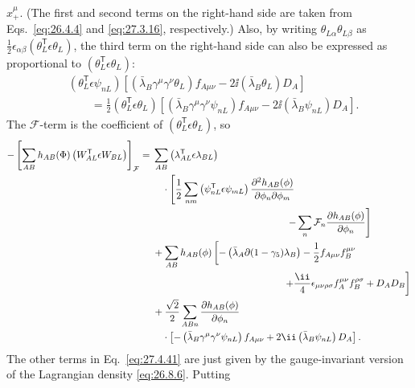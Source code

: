 \(x_+^\mu\). (The first and second terms on the right-hand side are taken
from Eqs.~\eqref{eq:26.4.4} and \eqref{eq:27.3.16}, respectively.) Also, by
writing \(\theta_{L\alpha}\theta_{L\beta}\) as
\(\tfrac12\epsilon_{\alpha\beta}
(\theta_L^{\mathsf T}\epsilon\theta_L)\), the third term on the right-hand
side can also be expressed as proportional to
\((\theta_L^{\mathsf T}\epsilon\theta_L)\):
\[
  \begin{aligned}
  &\left(\theta_L^{\mathsf T}\epsilon\psi_{nL}\right)
  \left[
    \left(\bar\lambda_B\gamma^\mu\gamma^\nu\theta_L\right)f_{A\mu\nu}
    -2\ii\left(\bar\lambda_B\theta_L\right)D_A
  \right]
  \\
  &\qquad
  =\frac12\left(\theta_L^{\mathsf T}\epsilon\theta_L\right)
  \left[
    \left(\bar\lambda_B\gamma^\mu\gamma^\nu\psi_{nL}\right)f_{A\mu\nu}
    -2\ii\left(\bar\lambda_B\psi_{nL}\right)D_A
  \right].
  \end{aligned}
\]
The \(\mathcal{F}\)-term is the coefficient of
\((\theta_L^{\mathsf T}\epsilon\theta_L)\), so
\[
  \begin{aligned}
  -\left[
    \sum_{AB}h_{AB}(\Phi)
    \left(W_{AL}^{\mathsf T}\epsilon W_{BL}\right)
  \right]_{\mathcal{F}}
  ={}&
  \sum_{AB}\left(\lambda_{AL}^{\mathsf T}\epsilon\lambda_{BL}\right)
  \\
  &\quad{}\cdot
  \left[
    \frac12\sum_{nm}
      \left(\psi_{nL}^{\mathsf T}\epsilon\psi_{mL}\right)
      \frac{\partial^2h_{AB}(\phi)}
           {\partial\phi_n\partial\phi_m}
  \right.
  \\
  &\hspace{48mm}\left.
    -\sum_n\mathcal{F}_n
      \frac{\partial h_{AB}(\phi)}{\partial\phi_n}
  \right]
  \\
  &+\sum_{AB}h_{AB}(\phi)
  \left[
    -\left(\bar\lambda_A\sl{\partial}
      (1-\gamma_5)\lambda_B\right)
    -\frac12f_{A\mu\nu}f_B^{\mu\nu}
  \right.
  \\
  &\hspace{47mm}\left.
    +\frac{\ii}{4}\epsilon_{\mu\nu\rho\sigma}
      f_A^{\mu\nu}f_B^{\rho\sigma}
    +D_AD_B
  \right]
  \\
  &+\frac{\sqrt{2}}2\sum_{ABn}
  \frac{\partial h_{AB}(\phi)}{\partial\phi_n}
  \\
  &\quad{}\cdot
  \left[
    -\left(\bar\lambda_B\gamma^\mu\gamma^\nu\psi_{nL}\right)f_{A\mu\nu}
    +2\ii\left(\bar\lambda_B\psi_{nL}\right)D_A
  \right].
  \end{aligned}
\]
The other terms in Eq.~\eqref{eq:27.4.41} are just given by the
gauge-invariant version of the Lagrangian density \eqref{eq:26.8.6}. Putting
